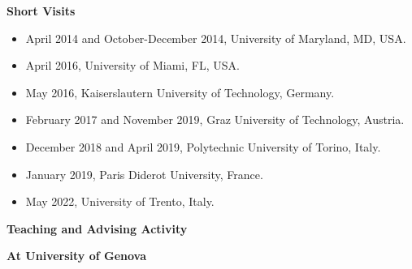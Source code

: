 \documentclass[11pt]{article}
\begin{document}
\vspace*{2.5ex}
\noindent
{\Large\bf Short Visits}
\begin{itemize}
\item April 2014 and October-December 2014, University of Maryland, MD, USA.
\item April 2016, University of Miami, FL, USA.
\item May 2016, Kaiserslautern University of Technology, Germany.
\item February 2017 and November 2019, Graz University of Technology, Austria.
\item December 2018 and April 2019, Polytechnic University of Torino, Italy.
\item January 2019, Paris Diderot University, France.
\item May 2022, University of Trento, Italy.
\end{itemize}



\vspace*{2.5ex}

\noindent
{\Large\bf Teaching and Advising Activity}

\vspace*{1.5ex}
\noindent
{\bf At University of Genova}
\end{document}
